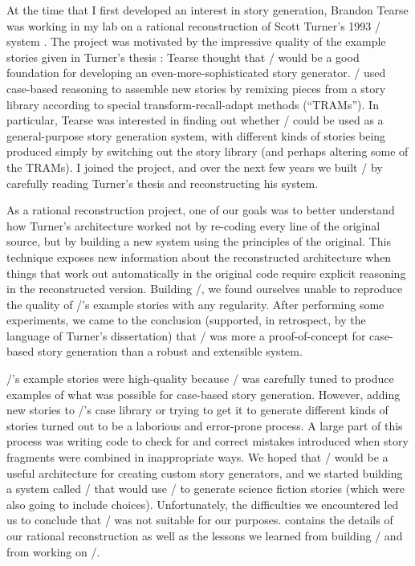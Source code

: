 At the time that I first developed an interest in story generation, Brandon Tearse was working in my lab on a rational reconstruction of Scott Turner's 1993 \minstrel/ system \citep{Turner1993}.
%
The project was motivated by the impressive quality of the example stories given in Turner's thesis \citep{Turner1993}: Tearse thought that \minstrel/ would be a good foundation for developing an even-more-sophisticated story generator.
%
\minstrel/ used case-based reasoning to assemble new stories by remixing pieces from a story library according to special transform-recall-adapt methods (``TRAMs'').
%
In particular, Tearse was interested in finding out whether \minstrel/ could be used as a general-purpose story generation system, with different kinds of stories being produced simply by switching out the story library (and perhaps altering some of the TRAMs).
%
I joined the project, and over the next few years we built \skald/ by carefully reading Turner's thesis and reconstructing his system.


As a rational reconstruction project, one of our goals was to better understand how Turner's architecture worked not by re-coding every line of the original source, but by building a new system using the principles of the original.
%
This technique exposes new information about the reconstructed architecture when things that work out automatically in the original code require explicit reasoning in the reconstructed version.
%
Building \skald/, we found ourselves unable to reproduce the quality of \minstrel/'s example stories with any regularity.
%
After performing some experiments, we came to the conclusion (supported, in retrospect, by the language of Turner's dissertation) that \minstrel/ was more a proof-of-concept for case-based story generation than a robust and extensible system.


\minstrel/'s example stories were high-quality because \minstrel/ was carefully tuned to produce examples of what was possible for case-based story generation.
%
However, adding new stories to \minstrel/'s case library or trying to get it to generate different kinds of stories turned out to be a laborious and error-prone process.
%
A large part of this process was writing code to check for and correct mistakes introduced when story fragments were combined in inappropriate ways.
%
We hoped that \skald/ would be a useful architecture for creating custom story generators, and we started building a system called \problemplanets/ that would use \skald/ to generate science fiction stories (which were also going to include choices).
%
Unfortunately, the difficulties we encountered led us to conclude that \skald/ was not suitable for our purposes.
%
 contains the details of our rational reconstruction as well as the lessons we learned from building \skald/ and from working on \problemplanets/.


